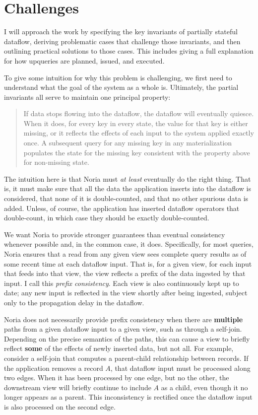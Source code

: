 \section{Challenges}
\label{s:challenges}

I will approach the work by specifying the key invariants of partially stateful
dataflow, deriving problematic cases that challenge those invariants, and then
outlining practical solutions to those cases. This includes giving a full
explanation for how upqueries are planned, issued, and executed.

To give some intuition for why this problem is challenging, we first need to
understand what the goal of the system as a whole is. Ultimately, the partial
invariants all serve to maintain one principal property:

\begin{quote}
	If data stops flowing into the dataflow, the dataflow will eventually
	quiesce. When it does, for every key in every state, the value for that
	key is either missing, or it reflects the effects of each input to the
	system applied exactly once. A subsequent query for any missing key in
	any materialization populates the state for the missing key consistent
	with the property above for non-missing state.
\end{quote}

The intuition here is that Noria must \emph{at least} eventually do the right
thing. That is, it must make sure that all the data the application inserts into
the dataflow is considered, that none of it is double-counted, and that no other
spurious data is added. Unless, of course, the application has inserted dataflow
operators that double-count, in which case they should be exactly
double-counted.

We want Noria to provide stronger guarantees than eventual consistency whenever
possible and, in the common case, it does. Specifically, for most queries, Noria
ensures that a read from any given view sees complete query results as of some
recent time at each dataflow input. That is, for a given view, for each input
that feeds into that view, the view reflects a prefix of the data ingested by
that input. I call this \emph{prefix consistency}. Each view is also
continuously kept up to date; any new input is reflected in the view shortly
after being ingested, subject only to the propagation delay in the dataflow.

Noria does not necessarily provide prefix consistency when there are
\textbf{multiple} paths from a given dataflow input to a given view, such as
through a self-join. Depending on the precise semantics of the paths, this can
cause a view to briefly reflect \textbf{some} of the effects of newly inserted
data, but not all. For example, consider a self-join that computes a
parent-child relationship between records. If the application removes a record
$A$, that dataflow input must be processed along two edges. When it has been
processed by one edge, but no the other, the downstream view will briefly
continue to include $A$ as a child, even though it no longer appears as a
parent. This inconsistency is rectified once the dataflow input is also
processed on the second edge.

